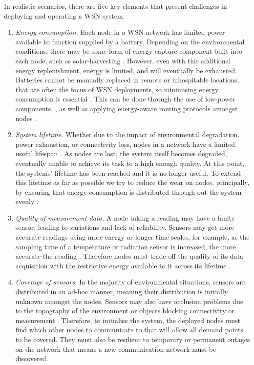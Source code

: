 \ifdefined\DEBUG {} \else \fi
In realistic scenarios, there are five key elements that present challenges in deploying and operating a WSN system.
\begin{enumerate}
\item \textit{Energy consumption.} Each node in a WSN network has limited power available to function supplied by a battery. Depending on the environmental conditions, there may be some form of energy-capture component built into each node, such as solar-harvesting \citep{Prauzek2018}. However, even with this additional energy replenishment, energy is limited, and will eventually be exhausted. Batteries cannot be manually replaced in remote or inhospitable locations, that are often the focus of WSN deployments, so minimising energy consumption is essential \citep{Anastasi2009}. This can be done through the use of low-power components, \citep{4772585, 8108667}, as well as applying energy-aware routing protocols amongst nodes \citep{s90100445}. 

\item \textit{System lifetime.} Whether due to the impact of environmental degradation, power exhaustion, or connectivity loss, nodes in a network have a limited useful lifespan \citep{Mak2009}. As nodes are lost, the system itself becomes degraded, eventually unable to achieve its task to a high enough quality. At this point, the systems' lifetime has been reached and it is no longer useful. To extend this lifetime as far as possible we try to reduce the wear on nodes, principally, by ensuring that energy consumption is distributed through out the system evenly \citep{BABAYO20171176, Engmann2018}.

\item \textit{Quality of measurement data.} A node taking a reading may have a faulty sensor, leading to variations and lack of reliability. Sensors may get more accurate readings using more energy or longer time scales, for example, as the sampling time of a temperature or radiation sensor is increased, the more accurate the reading \citep{s17061221}. Therefore nodes must trade-off the quality of its data acquisition with the restrictive energy available to it across its lifetime \citep{7845391}.

\item \textit{Coverage of sensors.} In the majority of environmental situations, sensors are distributed in an ad-hoc manner, meaning their distribution is initially unknown amongst the nodes. Sensors may also have occlusion problems due to the topography of the environment or objects blocking connectivity or measurement \citep{10.1007/978-3-540-69170-9_23}. Therefore, to initialise the system, the deployed nodes must find which other nodes to communicate to that will allow all demand points to be covered. They must also be resilient to temporary or permanent outages on the network that means a new communication network must be discovered. 


\end{enumerate}
